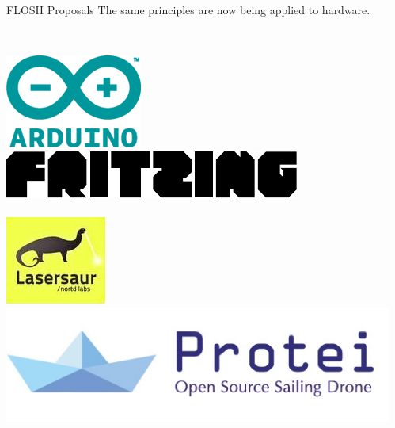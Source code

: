   \begin{frame}{FLOSH Proposals}
    The same principles are now being applied to hardware.\\~\\
    \begin{columns}
        \vspace{.5cm}
        \begin{center}
          \includegraphics[width=.35\textwidth]{vendor/images/arduino_logo.png} \hspace{.1\textwidth}
          \includegraphics[width=.5\textwidth]{vendor/images/fritzing_logo.pdf}\\~\\
          \includegraphics[width=.25\textwidth]{vendor/images/lasersaur.jpg} \hspace{.1\textwidth}
          \includegraphics[width=.6\textwidth]{vendor/images/protei.png}\\~\\
        \end{center}
        \begin{center}

\end{center}
\end{columns}
\end{frame}
